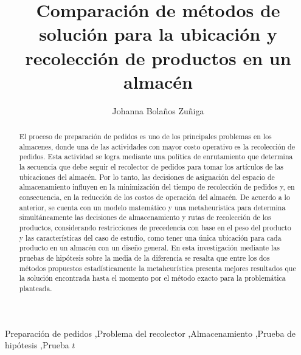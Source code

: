\documentclass[preprint,12pt, pdftex]{elsarticle}
\renewcommand{\abstractname}{Resumen}
\begin{document}
\begin{frontmatter}

\title{Comparación de métodos de solución para la ubicación y recolección de productos en un almacén}

\author{Johanna Bolaños Zuñiga}
\address{Universidad Autónoma, San Nicolás de los Garza, Nuevo León México}

\renewcommand{\abstractname}{Resumen}
\begin{abstract}
El proceso de preparación de pedidos es uno de los principales problemas en los almacenes, donde una de las actividades con mayor costo operativo es la recolección de pedidos. Esta actividad se logra mediante una política de enrutamiento que determina la secuencia que debe seguir el recolector de pedidos para tomar los artículos de las ubicaciones del almacén. Por lo tanto, las decisiones de asignación del espacio de almacenamiento influyen en la minimización del tiempo de recolección de pedidos y, en consecuencia, en la reducción de los costos de operación del almacén. De acuerdo a lo anterior, se cuenta con un modelo matemático y una metaheurística para determina simultáneamente las decisiones de almacenamiento y rutas de recolección de los productos, considerando restricciones de precedencia con base en el peso del producto y las características del caso de estudio, como tener una única ubicación para cada producto en un almacén con un diseño general. En esta investigación mediante las pruebas de hipótesis sobre la media de la diferencia se resalta que entre los dos métodos propuestos estadísticamente la metaheurística presenta mejores resultados que la solución encontrada hasta el momento por el método exacto para la problemática planteada.
\end{abstract}

\begin{keyword}
Preparación de pedidos \sep Problema del recolector \sep Almacenamiento \sep Prueba de hipótesis \sep Prueba $t$



\end{keyword}

\end{frontmatter}

\end{document}
